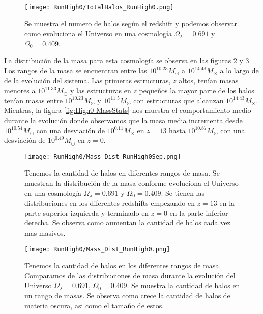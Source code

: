 \begin{figure}[H]
    \centering
    \texttt{[image: RunHigh0/TotalHalos\_RunHigh0.png]}
    \caption[Evolución del número de halos en un Universo $\Omega_\lambda = 0.691$, $\Omega_0 = 0.409$]{\footnotesize Se muestra el numero de halos según el redshift y podemos observar como evoluciona el Universo en una cosmología $\Omega_\lambda = 0.691$ y $\Omega_0 = 0.409$.}
    \label{fig:High0_TotalHalos}
\end{figure}

La distribución de la masa para esta cosmología se observa en las figuras \ref{fig:High0-MassDistSep} y \ref{fig:High0-MassDist}. Los rangos de la masa se encuentran entre las $10^{10.23}M_\odot$ a $10^{14.43}M_\odot$ a lo largo de de la evolución del sistema. Las primeras estructuras, $z$ altos, tenían masas menores a $10^{11.33}M_\odot$ y las estructuras en $z$ pequeños la mayor parte de los halos tenían masas entre $10^{10.23}M_\odot$ y $10^{11.5}M_\odot$ con estructuras que alcanzan $10^{14.43}M_\odot$. Mientras, la figura \ref{fig:High0-MassStats} nos muestra el comportamiento medio durante la evolución donde observamos que la masa media incrementa desde $10^{10.54}M_\odot$ con una desviación de $10^{0.11}M_\odot$ en $z=13$ hasta $10^{10.87}M_\odot$ con una desviación de $10^{0.49}M_\odot$ en $z=0$.

\begin{figure}[H]
    \centering
    \texttt{[image: RunHigh0/Mass\_Dist\_RunHigh0Sep.png]}
    \caption[Distribución de masa]{\footnotesize Tenemos la cantidad de halos en diferentes rangos de masa. Se muestran la distribución de la masa conforme evoluciona el Universo en una cosmología $\Omega_\lambda = 0.691$ y $\Omega_0 = 0.409$. Se tienen las distribuciones en los diferentes redshifts empezando en $z=13$ en la parte superior izquierda y terminado en $z=0$ en la parte inferior derecha. Se observa como aumentan la cantidad de halos cada vez mas masivos.}
    \label{fig:High0-MassDistSep}
\end{figure}

\begin{figure}[H]
    \centering
    \texttt{[image: RunHigh0/Mass\_Dist\_RunHigh0.png]}
    \caption[Comparación de distribución de masa]{\footnotesize Tenemos la cantidad de halos en los diferentes rangos de masa. Comparamos de las distribuciones de masa durante la evolución del Universo $\Omega_\lambda = 0.691$, $\Omega_0 = 0.409$. Se muestra la cantidad de halos en un rango de masas. Se observa como crece la cantidad de halos de materia oscura, asi como el tamaño de estos.}
    \label{fig:High0-MassDist}
\end{figure}

